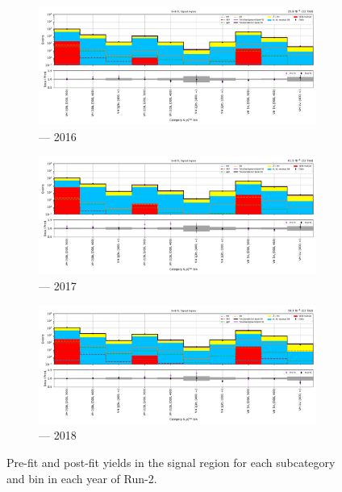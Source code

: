 \begin{figure}[htbp]
    \centering
    \begin{subfigure}[b]{0.9\textwidth}
        \includegraphics[width=\textwidth]{figures/mountain_ranges/2016/VH/SR_tree_fit_s-abs_values_VH_cats.pdf}
        \caption{\VH --- 2016}
    \end{subfigure}

    \begin{subfigure}[b]{0.9\textwidth}
        \includegraphics[width=\textwidth]{figures/mountain_ranges/2017/VH/SR_tree_fit_s-abs_values_VH_cats.pdf}
        \caption{\VH --- 2017}
    \end{subfigure}

    \begin{subfigure}[b]{0.9\textwidth}
        \includegraphics[width=\textwidth]{figures/mountain_ranges/2018/VH/SR_tree_fit_s-abs_values_VH_cats.pdf}
        \caption{\VH --- 2018}
    \end{subfigure}
    \caption[Pre-fit and post-fit yields in the signal region for each \VH subcategory and \ptmiss bin in each year of Run-2]{Pre-fit and post-fit yields in the signal region for each \VH subcategory and \ptmiss bin in each year of Run-2.}
    \label{fig:htoinv_mountain_range_VH_SR}
\end{figure}

